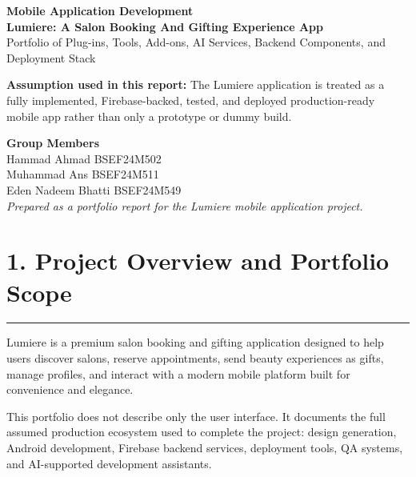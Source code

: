 \documentclass[11pt,a4paper]{article}
\newcommand{\PageTitle}[1]{\section*{#1}\vspace{2pt}\textcolor{LumiereGold}{\rule{\textwidth}{1.1pt}}\vspace{6pt}}
\begin{document}
\pagecolor{white}
\thispagestyle{empty}

\vspace*{1.0cm}
\begin{center}
{\fontsize{20}{24}\selectfont\bfseries\textcolor{LumiereGold}{Mobile Application Development}}\\[1.2cm]
{\fontsize{24}{28}\selectfont\bfseries\textcolor{LumiereDark}{Lumiere: A Salon Booking And Gifting Experience App}}\\[0.45cm]
{\large\textcolor{LumiereMuted}{Portfolio of Plug-ins, Tools, Add-ons, AI Services, Backend Components, and Deployment Stack}}\\[1.0cm]
\end{center}

\begin{tcolorbox}[colback=LumiereCream,colframe=LumiereLine,boxrule=0.6pt,arc=2mm,left=5mm,right=5mm,top=4mm,bottom=4mm]
\centering
\textbf{\textcolor{LumiereDark}{Assumption used in this report:}} The Lumiere application is treated as a fully implemented, Firebase-backed, tested, and deployed production-ready mobile app rather than only a prototype or dummy build.
\end{tcolorbox}

\vfill
\begin{center}
{\large\bfseries\textcolor{LumiereGold}{Group Members}}\\[0.35cm]
{\large\textcolor{LumiereDark}{Hammad Ahmad \textbar{} BSEF24M502}}\\[0.15cm]
{\large\textcolor{LumiereDark}{Muhammad Ans \textbar{} BSEF24M511}}\\[0.15cm]
{\large\textcolor{LumiereDark}{Eden Nadeem Bhatti \textbar{} BSEF24M549}}\\[1.2cm]
{\normalsize\textit{\textcolor{LumiereMuted}{Prepared as a portfolio report for the Lumiere mobile application project.}}}
\end{center}

\newpage
\PageTitle{1. Project Overview and Portfolio Scope}

Lumiere is a premium salon booking and gifting application designed to help users discover salons, reserve appointments, send beauty experiences as gifts, manage profiles, and interact with a modern mobile platform built for convenience and elegance.

This portfolio does not describe only the user interface. It documents the full assumed production ecosystem used to complete the project: design generation, Android development, Firebase backend services, deployment tools, QA systems, and AI-supported development assistants.
\end{document}
